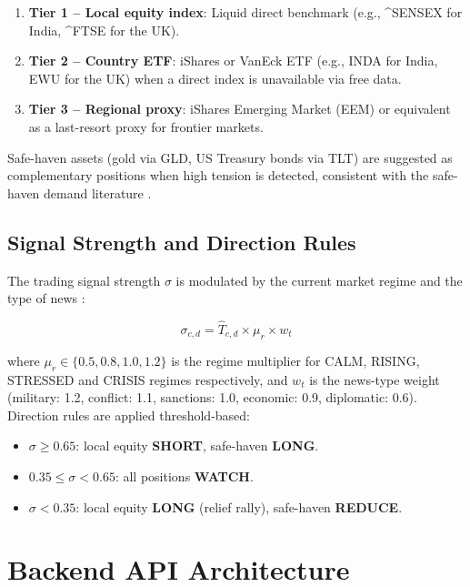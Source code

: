\documentclass[12pt,a4paper]{report}
\begin{document}
\begin{enumerate}
  \item \textbf{Tier 1 -- Local equity index}: Liquid direct benchmark
        (e.g., \^{}SENSEX for India, \^{}FTSE for the UK).
  \item \textbf{Tier 2 -- Country ETF}: iShares or VanEck ETF (e.g., INDA
        for India, EWU for the UK) when a direct index is unavailable via
        free data.
  \item \textbf{Tier 3 -- Regional proxy}: iShares Emerging Market (EEM)
        or equivalent as a last-resort proxy for frontier markets.
\end{enumerate}

Safe-haven assets (gold via GLD, US Treasury bonds via TLT) are suggested
as complementary positions when high tension is detected, consistent with
the safe-haven demand literature \cite{bloom2009, caldara2022}.

\subsection{Signal Strength and Direction Rules}

The trading signal strength $\sigma$ is modulated by the current market
regime and the type of news \cite{caldara2022}:

\begin{equation}
  \sigma_{c,d} = \hat{T}_{c,d} \times \mu_r \times w_t
  \label{eq:signal_strength}
\end{equation}

\noindent where $\mu_r \in \{0.5, 0.8, 1.0, 1.2\}$ is the regime
multiplier for CALM, RISING, STRESSED and CRISIS regimes respectively,
and $w_t$ is the news-type weight (military: 1.2, conflict: 1.1,
sanctions: 1.0, economic: 0.9, diplomatic: 0.6). Direction rules are
applied threshold-based:

\begin{itemize}
  \item $\sigma \geq 0.65$: local equity \textbf{SHORT},
        safe-haven \textbf{LONG}.
  \item $0.35 \leq \sigma < 0.65$: all positions \textbf{WATCH}.
  \item $\sigma < 0.35$: local equity \textbf{LONG} (relief rally),
        safe-haven \textbf{REDUCE}.
\end{itemize}

\section{Backend API Architecture}
\end{document}
